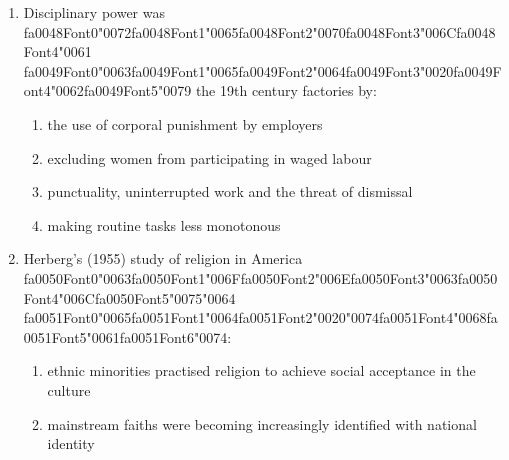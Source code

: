 \documentclass[12pt]{article}
\begin{document}
\begin{enumerate}[label=\arabic*.]
\begin{enumerate}[label=(\alph*)]
    \item embrace conventional cultural values but offer new means of achieving them
    \item react against the loss of any meaningful religious content in the teachings of churches
    \item adopt an attitude of mild disapproval towards mainstream social values
    \item reject both the goals and means of conventional society and provide utopian alternatives
\end{enumerate}
\item Disciplinary power was {\csname fa0048Font0\endcsname\char"0072}{\csname fa0048Font1\endcsname\char"0065}{\csname fa0048Font2\endcsname\char"0070}{\csname fa0048Font3\endcsname\char"006C}{\csname fa0048Font4\endcsname\char"0061} {\csname fa0049Font0\endcsname\char"0063}{\csname fa0049Font1\endcsname\char"0065}{\csname fa0049Font2\endcsname\char"0064}{\csname fa0049Font3\endcsname\char"0020}{\csname fa0049Font4\endcsname\char"0062}{\csname fa0049Font5\endcsname\char"0079} the 19th century factories by:
\begin{enumerate}[label=(\alph*)]
    \item the use of corporal punishment by employers
    \item excluding women from participating in waged labour
    \item punctuality, uninterrupted work and the threat of dismissal
    \item making routine tasks less monotonous
\end{enumerate}
\item Herberg's (1955) study of religion in America {\csname fa0050Font0\endcsname\char"0063}{\csname fa0050Font1\endcsname\char"006F}{\csname fa0050Font2\endcsname\char"006E}{\csname fa0050Font3\endcsname\char"0063}{\csname fa0050Font4\endcsname\char"006C}{\csname fa0050Font5\endcsname\char"0075}{\char"0064} {\csname fa0051Font0\endcsname\char"0065}{\csname fa0051Font1\endcsname\char"0064}{\csname fa0051Font2\endcsname\char"0020}{\char"0074}{\csname fa0051Font4\endcsname\char"0068}{\csname fa0051Font5\endcsname\char"0061}{\csname fa0051Font6\endcsname\char"0074}:
\begin{enumerate}[label=(\alph*)]
    \item ethnic minorities practised religion to achieve social acceptance in the culture
    \item mainstream faiths were becoming increasingly identified with national identity

\end{enumerate}
\end{enumerate}
\end{document}
